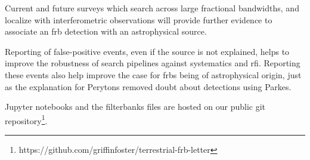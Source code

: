 \documentclass[a4paper,fleqn,usenatbib]{mnras}
\begin{document}
Current and future surveys which search across large fractional bandwidths, and
localize with interferometric observations will provide further evidence to
associate an \gls{frb} detection with an astrophysical source.

Reporting of false-positive events, even if the source is not explained, helps
to improve the robustness of search pipelines against systematics and \gls{rfi}.
Reporting these events also help improve the case for \glspl{frb} being of
astrophysical origin, just as the explanation for Perytons
\citep{2015MNRAS.451.3933P} removed doubt about detections using Parkes.

Jupyter notebooks and the filterbanks files are hosted on our
public git
repository\footnote{https://github.com/griffinfoster/terrestrial-frb-letter}.


 

\bsp	%
\label{lastpage}
\end{document}
